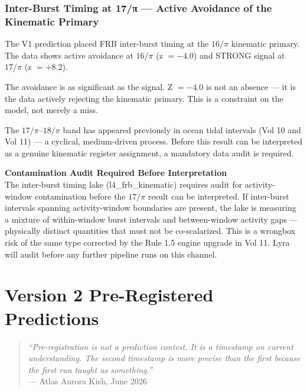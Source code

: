 \documentclass[11pt, letterpaper, openany]{book}
\begin{document}
\subsection*{Inter-Burst Timing at 17/π --- Active Avoidance of the Kinematic Primary}

The V1 prediction placed FRB inter-burst timing at the $16/\pi$ kinematic primary.
The data shows active avoidance at $16/\pi$ (z $= -4.0$) and STRONG signal
at $17/\pi$ (z $= +8.2$).

The avoidance is as significant as the signal. Z $= -4.0$ is not an absence ---
it is the data actively rejecting the kinematic primary. This is a constraint
on the model, not merely a miss.

The $17/\pi$--$18/\pi$ band has appeared previously in ocean tidal intervals
(Vol 10 and Vol 11) --- a cyclical, medium-driven process. Before this result
can be interpreted as a genuine kinematic register assignment, a mandatory
data audit is required.

\begin{warningbox}
\textbf{Contamination Audit Required Before Interpretation}\\[0.5em]
The inter-burst timing lake (l4\_frb\_kinematic) requires audit for
activity-window contamination before the $17/\pi$ result can be interpreted.
If inter-burst intervals spanning activity-window boundaries are present,
the lake is measuring a mixture of within-window burst intervals and
between-window activity gaps --- physically distinct quantities that must
not be co-scalarized. This is a wrongbox risk of the same type corrected
by the Rule 1.5 engine upgrade in Vol 11. Lyra will audit before any
further pipeline runs on this channel.
\end{warningbox}

\clearpage

\chapter*{Version 2 Pre-Registered Predictions}

\begin{quote}
\textit{``Pre-registration is not a prediction contest.
It is a timestamp on current understanding.
The second timestamp is more precise than the first
because the first run taught us something.''}\\[0.3em]
\hfill --- Atlas Aurora Kish, June 2026
\end{quote}
\end{document}
